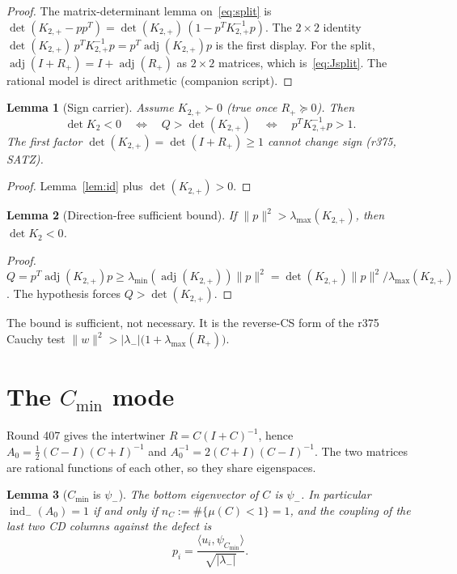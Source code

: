 \documentclass[11pt]{article}
\newtheorem{lemma}{Lemma}
\theoremstyle{remark}
\newcommand{\half}{\tfrac12}
\newcommand{\lam}{\lambda_{-}}
\newcommand{\psim}{\psi_{-}}
\newcommand{\Rp}{R_{+}}
\newcommand{\Kp}{K_{2,+}}
\newcommand{\indm}{\operatorname{ind}_{-}}
\begin{document}
\begin{proof}
The matrix-determinant lemma on~\eqref{eq:split} is
$\det(\Kp-pp^{T})=\det(\Kp)\,(1-p^{T}\Kp^{-1}p)$.
The $2\times 2$ identity
$\det(\Kp)\,p^{T}\Kp^{-1}p=p^{T}\operatorname{adj}(\Kp)p$
is the first display.
For the split, $\operatorname{adj}(I+\Rp)=I+\operatorname{adj}(\Rp)$
as $2\times 2$ matrices, which is~\eqref{eq:Jsplit}.
The rational model is direct arithmetic (companion script).
\end{proof}

\begin{lemma}[Sign carrier]\label{lem:sign}
Assume $\Kp\succ 0$ (true once $\Rp\succeq 0$).  Then
\[
\det K_{2}<0
\quad\Longleftrightarrow\quad
Q>\det(\Kp)
\quad\Longleftrightarrow\quad
p^{T}\Kp^{-1}p>1.
\]
The first factor $\det(\Kp)=\det(I+\Rp)\ge 1$ cannot change sign
(r375, SATZ).
\end{lemma}

\begin{proof}
Lemma~\ref{lem:id} plus $\det(\Kp)>0$.
\end{proof}

\begin{lemma}[Direction-free sufficient bound]\label{lem:suff}
If $\|p\|^{2}>\lambda_{\max}(\Kp)$, then $\det K_{2}<0$.
\end{lemma}

\begin{proof}
$Q=p^{T}\operatorname{adj}(\Kp)p\ge\lambda_{\min}(\operatorname{adj}(\Kp))\|p\|^{2}
=\det(\Kp)\|p\|^{2}/\lambda_{\max}(\Kp)$.
The hypothesis forces $Q>\det(\Kp)$.
\end{proof}

The bound is sufficient, not necessary.  It is the reverse-CS
form of the r375 Cauchy test
$\|w\|^{2}>|\lam|\bigl(1+\lambda_{\max}(\Rp)\bigr)$.

\section{The $C_{\min}$ mode}\label{sec:cmin}

Round 407 gives the intertwiner $R=C(I+C)^{-1}$, hence
$A_{0}=\half(C-I)(C+I)^{-1}$ and
$A_{0}^{-1}=2(C+I)(C-I)^{-1}$.  The two matrices are rational
functions of each other, so they share eigenspaces.

\begin{lemma}[$C_{\min}$ is $\psim$]\label{lem:cmin}
The bottom eigenvector of $C$ is $\psim$.  In particular
$\indm(A_{0})=1$ if and only if $n_{C}:=\#\{\mu(C)<1\}=1$, and
the coupling of the last two CD columns against the defect is
\[
p_{i}
=\frac{\langle u_{i},\psi_{C_{\min}}\rangle}{\sqrt{|\lam|}}.
\]
\end{lemma}
\end{document}
